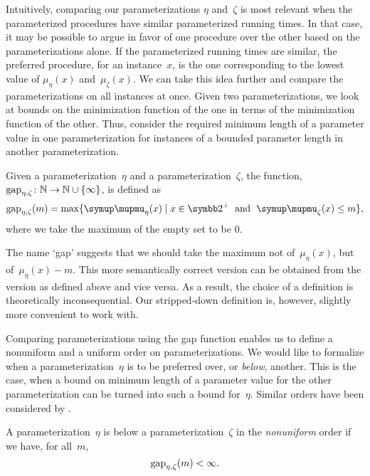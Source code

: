 Intuitively, comparing our parameterizations $\eta$ and~$\zeta$ is most relevant when the parameterized procedures have similar parameterized running times.
In that case, it may be possible to argue in favor of one procedure over the other based on the parameterizations alone.
If the parameterized running times are similar, the preferred procedure, for an instance~$x$, is the one corresponding to the lowest value of $\mu_\eta(x)$ and~$\mu_\zeta(x)$.
We can take this idea further and compare the parameterizations on all instances at once.
Given two parameterizations, we look at bounds on the minimization function of the one in terms of the minimization function of the other.
Thus, consider the required minimum length of a parameter value in one parameterization for instances of a bounded parameter length in another parameterization.
\begin{definition}
  Given a parameterization~$\eta$ and a parameterization~$\zeta$, the  function, $\operatorname{gap}_{\eta, \zeta}\colon \mathbb{N} \to \mathbb{N} \cup \{\infty\}$, is defined as
  \begin{equation*}
    \gap_{\eta, \zeta}(m) \deq \max\{\mu_{\eta}(x) \st x \in \binary^+ \reland \mu_{\zeta}(x) \le m\},
  \end{equation*}
  where we take the maximum of the empty set to be $0$.
\end{definition}

The name \enquote*{gap} suggests that we should take the maximum not of~$\mu_\eta(x)$, but of~$\mu_\eta(x) - m$.
This more semantically correct version can be obtained from the version as defined above and vice versa.
As a result, the choice of a definition is theoretically inconsequential.
Our stripped-down definition is, however, slightly more convenient to work with.

Comparing parameterizations using the gap function enables us to define a nonuniform and a uniform order on parameterizations.
We would like to formalize when a parameterization~$\eta$ is to be preferred over, or \emph{below}, another.
This is the case, when a bound on minimum length of a parameter value for the other parameterization can be turned into such a bound for~$\eta$.
Similar orders have been considered by \textcite{komusiewicz2012new,fellows2013towards}.

\begin{definition}
  A parameterization~$\eta$ is below a parameterization~$\zeta$ in the \emph{nonuniform} order  if we have, for all~$m$,
  \begin{equation*}
    \operatorname{gap}_{\eta, \zeta}(m) < \infty.
  \end{equation*}
\end{definition}

